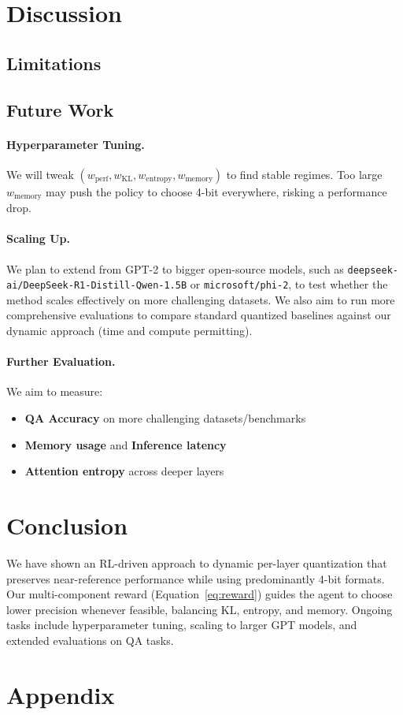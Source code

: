 \documentclass{article}
\begin{document}
\section{Discussion}

\subsection{Limitations}

\subsection{Future Work}
\paragraph{Hyperparameter Tuning.}
We will tweak $(w_{\mathrm{perf}}, w_{\mathrm{KL}}, w_{\mathrm{entropy}}, w_{\mathrm{memory}})$ to find stable regimes. Too large $w_{\mathrm{memory}}$ may push the policy to choose 4-bit everywhere, risking a performance drop.

\paragraph{Scaling Up.}
We plan to extend from GPT-2 to bigger open-source models, such as \texttt{deepseek-ai/DeepSeek-R1-Distill-Qwen-1.5B} or \texttt{microsoft/phi-2}, to test whether the method scales effectively on more challenging datasets. We also aim to run more comprehensive evaluations to compare standard quantized baselines against our dynamic approach (time and compute permitting).

\paragraph{Further Evaluation.}
We aim to measure:
\begin{itemize}
	\item \textbf{QA Accuracy} on more challenging datasets/benchmarks 
	\item \textbf{Memory usage} and \textbf{Inference latency}
	\item \textbf{Attention entropy} across deeper layers
\end{itemize}

\section{Conclusion}
We have shown an RL-driven approach to dynamic per-layer quantization that preserves near-reference performance while using predominantly 4-bit formats. Our multi-component reward (Equation~\ref{eq:reward}) guides the agent to choose lower precision whenever feasible, balancing KL, entropy, and memory. Ongoing tasks include hyperparameter tuning, scaling to larger GPT models, and extended evaluations on QA tasks.

\section*{Appendix}



\end{document}
